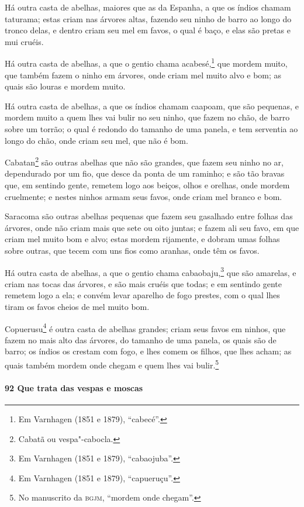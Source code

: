 Há outra casta de abelhas, maiores que as da Espanha, a que os índios chamam taturama;
estas criam nas árvores altas, fazendo seu ninho de barro ao longo do tronco delas, e
dentro criam seu mel em favos, o qual é baço, e elas são pretas e mui cruéis.

Há outra casta de abelhas, a que o gentio chama acabesé,\footnote{ Em Varnhagen (1851 e
1879), ``cabecé''.} que mordem muito, que também fazem o ninho em árvores, onde criam mel
muito alvo e bom; as quais são louras e mordem muito.

Há outra casta de abelhas, a que os índios chamam caapoam, que são pequenas, e mordem
muito a quem lhes vai bulir no seu ninho, que fazem no chão, de barro sobre um torrão; o
qual é redondo do tamanho de uma panela, e tem serventia ao longo do chão, onde criam seu
mel, que não é bom.

Cabatan\footnote{ Cabatã ou vespa"-cabocla.} são outras abelhas que não são grandes, que
fazem seu ninho no ar, dependurado por um fio, que desce da ponta de um raminho; e são tão
bravas que, em sentindo gente, remetem logo aos beiços, olhos e orelhas, onde mordem
cruelmente; e nestes ninhos armam seus favos, onde criam mel branco e bom.

Saracoma são outras abelhas pequenas que fazem seu gasalhado entre folhas das árvores,
onde não criam mais que sete ou oito juntas; e fazem ali seu favo, em que criam mel muito
bom e alvo; estas mordem rijamente, e dobram umas folhas sobre outras, que tecem com uns
fios como aranhas, onde têm os favos.

Há outra casta de abelhas, a que o gentio chama cabaobaju,\footnote{ Em Varnhagen (1851 e
1879), ``cabaojuba''.} que são amarelas, e criam nas tocas das árvores, e são mais cruéis
que todas; e em sentindo gente remetem logo a ela; e convém levar aparelho de fogo
prestes, com o qual lhes tiram os favos cheios de mel muito bom.

Copuerusu\footnote{ Em Varnhagen (1851 e 1879), ``capueruçu''.} é outra casta de abelhas
grandes; criam seus favos em ninhos, que fazem no mais alto das árvores, do tamanho de uma
panela, os quais são de barro; os índios os crestam com fogo, e lhes comem os filhos, que
lhes acham; as quais também mordem onde chegam e quem lhes vai bulir.\footnote{ No
manuscrito da \textsc{bgjm}, ``mordem onde chegam''.}

\paragraph{92 Que trata das vespas e moscas}


